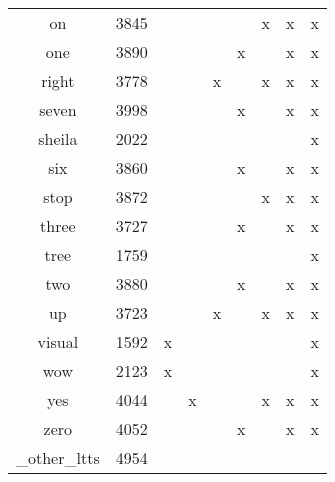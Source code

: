 \begin{table}[h!]
\begin{tabular}{|c|c|ccccccc|}
        \hline
        on & 3845             &   &   &   &   & x & x & x  \\
        one & 3890            &   &   &   & x &   & x & x  \\
        right & 3778          &   &   & x &   & x & x & x  \\
        seven & 3998          &   &   &   & x &   & x & x  \\
        \hline
        sheila & 2022         &   &   &   &   &   &   & x  \\
        six & 3860            &   &   &   & x &   & x & x  \\
        stop & 3872           &   &   &   &   & x & x & x  \\
        three & 3727          &   &   &   & x &   & x & x  \\
        \hline
        tree & 1759           &   &   &   &   &   &   & x  \\
        two & 3880            &   &   &   & x &   & x & x  \\
        up & 3723             &   &   & x &   & x & x & x  \\
        visual & 1592         & x &   &   &   &   &   & x  \\
        \hline
        wow & 2123            & x &   &   &   &   &   & x  \\
        yes & 4044            &   & x &   &   & x & x & x  \\
        zero & 4052           &   &   &   & x &   & x & x  \\
        \_other\_ltts & 4954  &   &   &   &   &   &   &    \\
        \hline
    \end{tabular}
\end{table}

